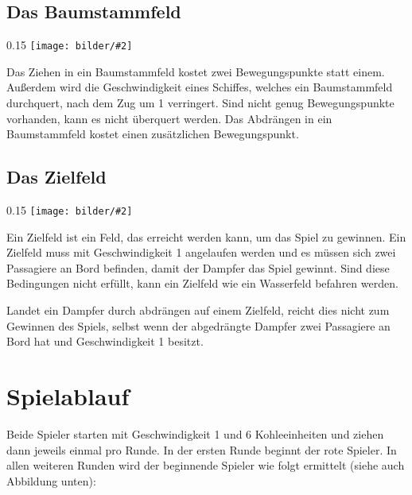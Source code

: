 \documentclass[12pt,a4paper, ngerman, oneside]{scrartcl}
\newcommand{\fieldGraphic}[2]{%
\begin{floatingfigure}[#1]{0.15\textwidth}%
  \centering
  \texttt{[image: bilder/\#2]}%
\end{floatingfigure}%
}
\begin{document}
\paragraph{}

\subsection{Das Baumstammfeld}

\fieldGraphic{r}{baumstaemme}

Das Ziehen in ein Baumstammfeld kostet zwei Bewegungspunkte statt einem.
Außerdem wird die Geschwindigkeit eines Schiffes, welches ein Baumstammfeld
durchquert, nach dem Zug um 1 verringert. Sind nicht genug Bewegungspunkte
vorhanden, kann es nicht überquert werden. Das Abdrängen in ein Baumstammfeld
kostet einen zusätzlichen Bewegungspunkt.

\paragraph{}

\subsection{\label{goal}Das Zielfeld}

\fieldGraphic{r}{ziel}

Ein Zielfeld ist ein Feld, das erreicht werden kann, um das Spiel zu gewinnen.
Ein Zielfeld muss mit Geschwindigkeit 1 angelaufen werden und es müssen sich
zwei Passagiere an Bord befinden, damit der Dampfer das Spiel gewinnt. Sind
diese Bedingungen nicht erfüllt, kann ein Zielfeld wie ein Wasserfeld befahren
werden.

Landet ein Dampfer durch abdrängen auf einem Zielfeld, reicht dies nicht zum
Gewinnen des Spiels, selbst wenn der abgedrängte Dampfer zwei Passagiere an Bord
hat und Geschwindigkeit 1 besitzt.

\paragraph{}

\section{Spielablauf}

Beide Spieler starten mit Geschwindigkeit 1 und 6 Kohleeinheiten und ziehen dann
jeweils einmal pro Runde. In der ersten Runde beginnt der rote Spieler. In allen
weiteren Runden wird der beginnende Spieler wie folgt ermittelt (siehe auch Abbildung unten):
\end{document}
